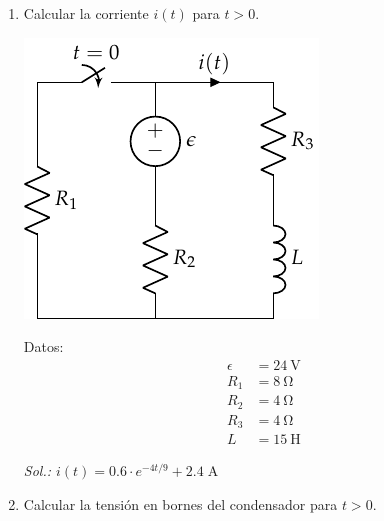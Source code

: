 \begin{enumerate}
\item Calcular la corriente $i(t)$ para $t > 0$.

\begin{minipage}{0.5\textwidth}
  \includegraphics{../figs/FM_4_2}
\end{minipage}
\hfill
\begin{minipage}{0.5\textwidth}
  Datos:
  \begin{align*}
    \epsilon &= \SI{24}{\volt}\\
    R_1 &= \SI{8}{\ohm}\\
    R_2 &= \SI{4}{\ohm}\\
    R_3 &= \SI{4}{\ohm}\\
    L &= \SI{15}{\henry}
  \end{align*}
\end{minipage}

\vspace{2mm}
\emph{Sol.:\; $i(t) = 0.6 \cdot e^{-4t/9} + 2.4 \;\si{\ampere}$}

\item Calcular la tensión en bornes del condensador para $t > 0$.


\end{enumerate}
